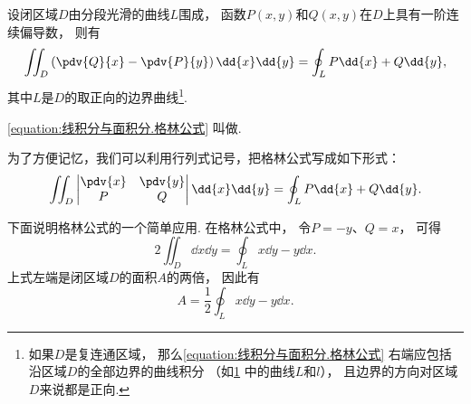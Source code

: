 \begin{figure}[htb]
\centering
{}
\caption{}
\label{figure:线积分与面积分.平面区域的边界曲线与其取向}
\end{figure}

\begin{theorem}[格林公式]
设闭区域\(D\)由分段光滑的曲线\(L\)围成，
函数\(P(x,y)\)和\(Q(x,y)\)在\(D\)上具有一阶连续偏导数，
则有
\begin{equation}\label{equation:线积分与面积分.格林公式}
	\iint_D \left( \pdv{Q}{x} - \pdv{P}{y} \right) \dd{x}\dd{y}
	= \oint_L P\dd{x} + Q\dd{y},
\end{equation}
其中\(L\)是\(D\)的取正向的边界曲线\footnote{%
如果\(D\)是复连通区域，
那么\cref{equation:线积分与面积分.格林公式}
右端应包括沿区域\(D\)的全部边界的曲线积分
（如\cref{figure:线积分与面积分.平面区域的边界曲线与其取向} 中的曲线\(L\)和\(l\)），
且边界的方向对区域\(D\)来说都是正向.}.
\end{theorem}
\cref{equation:线积分与面积分.格林公式} 叫做.

为了方便记忆，我们可以利用行列式记号，把格林公式写成如下形式：\[
	\iint_D \begin{vmatrix}
		\pdv{x} & \pdv{y} \\
		P & Q
	\end{vmatrix} \dd{x}\dd{y}
	= \oint_L P\dd{x}+Q\dd{y}.
\]

下面说明格林公式的一个简单应用.
在格林公式中，
令\(P=-y\)、\(Q=x\)，
可得\[
	2 \iint_D \dd{x}\dd{y}
	=\oint_L x\dd{y}-y\dd{x}.
\]
上式左端是闭区域\(D\)的面积\(A\)的两倍，
因此有
\begin{equation}\label{equation:线积分与面积分.利用格林公式计算闭区域的面积}
	A = \frac{1}{2} \oint_L x\dd{y}-y\dd{x}.
\end{equation}

